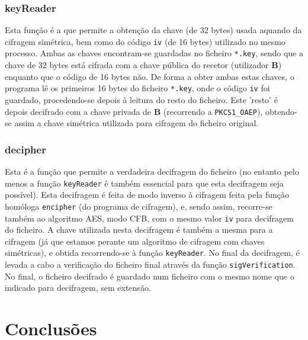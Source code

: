 \documentclass[a4paper,11pt,openright,oneside]{report}
\begin{document}
\subsection{keyReader}

Esta função é a que permite a obtenção da chave (de 32 bytes) usada aquando da cifragem simétrica, bem como do código \verb|iv| (de 16 bytes) utilizado no mesmo processo. Ambas as chaves encontram-se guardadas no ficheiro \verb|*.key|, sendo que a chave de 32 bytes está cifrada com a chave pública do recetor (utilizador \textbf{B}) enquanto que o código de 16 bytes não. De forma a obter ambas estas chaves, o programa lê os primeiros 16 bytes do ficheiro \verb|*.key|, onde o código \verb|iv| foi guardado, procedendo-se depois à leitura do resto do ficheiro. Este 'resto' é depois decifrado com a chave privada de \textbf{B} (recorrendo a \verb|PKCS1_OAEP|), obtendo-se assim a chave simétrica utilizada para cifragem do ficheiro original.

\subsection{decipher}

Esta é a função que permite a verdadeira decifragem do ficheiro (no entanto pelo menos a função \verb|keyReader| é também essencial para que esta decifragem seja possível). Esta decifragem é feita de modo inverso à cifragem feita pela função homóloga \verb|encipher| (do programa de cifragem), e, sendo assim, recorre-se também ao algoritmo AES, modo CFB, com o mesmo valor \verb|iv| para decifragem do ficheiro. A chave utilizada nesta decifragem é também a mesma para a cifragem (já que estamos perante um algoritmo de cifragem com chaves simétricas), e obtida recorrendo-se à função \verb|keyReader|. No final da decifragem, é levada a cabo a verificação do ficheiro final através da função \verb|sigVerification|.\\

No final, o ficheiro decifrado é guardado num ficheiro com o mesmo nome que o indicado para decifragem, sem extensão.

\chapter{Conclusões}
\label{chap.conclusões}
\end{document}
